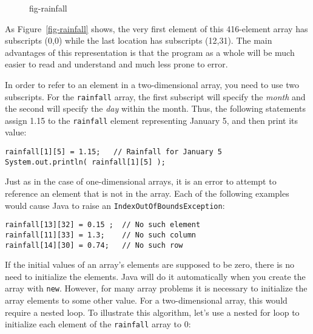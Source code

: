 \begin{figure}[bth]
{fig-rainfall}
\end{figure}

As Figure~\ref{fig-rainfall} shows, the very first element of this
416-element array has subscripts (0,0) while the last location has
subscripts (12,31). The main advantages of this representation is that
the program as a whole will be much easier to read and understand and
much less prone to error.


In order to refer to an element in a two-dimensional array, you need
to use two subscripts.  For the {\tt rainfall} array, the first
subscript will specify the {\it month} and the second will specify the
{\it day} within the month.  Thus, the following statements assign 1.15 to
the {\tt rainfall} element representing January 5, and then print its
value:

\begin{jjjlisting}
\begin{lstlisting}
rainfall[1][5] = 1.15;   // Rainfall for January 5
System.out.println( rainfall[1][5] );
\end{lstlisting}
\end{jjjlisting}

Just as in the case of one-dimensional arrays, it is an error to
attempt to reference an element that is not in the array.  Each of the
following examples would cause Java to raise an
{\tt IndexOutOfBoundsException}:

\begin{jjjlisting}
\begin{lstlisting}
rainfall[13][32] = 0.15 ;  // No such element
rainfall[11][33] = 1.3;    // No such column
rainfall[14][30] = 0.74;   // No such row
\end{lstlisting}
\end{jjjlisting}

If the initial values of an array's elements are supposed to be zero,
there is no need to initialize the elements.  Java will do it
automatically when you create the array with {\tt new}. However, for
many array problems it is necessary to initialize the array elements
to some other value.  For a two-dimensional array, this would require a
nested loop.  To illustrate this algorithm, let's use a nested for loop
to initialize each element of the {\tt rainfall} array to 0:

